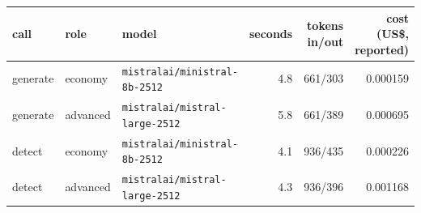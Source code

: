 \begin{tabular}{@{}l l l r r r@{}}
\toprule
call & role & model & seconds & tokens in/out & cost (US\$, reported)\\
\midrule
generate & economy & \texttt{mistralai/ministral-8b-2512} & 4.8 & 661/303 & 0.000159\\
generate & advanced & \texttt{mistralai/mistral-large-2512} & 5.8 & 661/389 & 0.000695\\
detect & economy & \texttt{mistralai/ministral-8b-2512} & 4.1 & 936/435 & 0.000226\\
detect & advanced & \texttt{mistralai/mistral-large-2512} & 4.3 & 936/396 & 0.001168\\
\bottomrule
\end{tabular}
